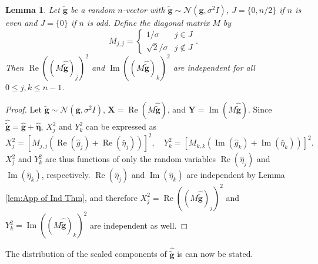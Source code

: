 \documentclass[12pt]{article}
\newcommand{\gVec}{\mathbf{g}}	%
\newcommand{\gnoiseVec}{\widetilde{\mathbf{g}}}	%
\newcommand{\noise}{\eta}	%
\newcommand{\noiseSD}{\sigma}	%
\newcommand{\noiseVec}{\bm{\noise}}	%
\renewcommand{\Re}{\operatorname{Re}}	%
\renewcommand{\Im}{\operatorname{Im}}	%
\newtheorem{lemma}{Lemma}[section]
\begin{document}
\begin{lemma}
\label{lem:App of Ind Thm 2}
Let $\gnoiseVec$ be a random $n$-vector with $\gnoiseVec \sim \mathcal{N}(\gVec,\noiseSD^2 I)$, $J = \{0,n/2\}$ if $n$ is even and $J = \{0\}$ if $n$ is odd. Define the diagonal matrix $M$ by
\[M_{j,j} = \begin{cases}
1/\noiseSD & j \in J \\
\sqrt{2}/\noiseSD & j \not\in J
\end{cases}.\]
Then $\Re((M\widehat{\gnoiseVec})_j)^2$ and $\Im((M\widehat{\gnoiseVec})_k)^2$ are independent for all $0 \leq j,k \leq n-1$.
\end{lemma}
\begin{proof}
Let $\gnoiseVec \sim \mathcal{N}(\gVec,\noiseSD^2 I)$, $\mathbf{X} = \Re(M\widehat{\gnoiseVec})$, and $\mathbf{Y} = \Im(M\widehat{\gnoiseVec})$. Since $\widehat{\gnoiseVec} = \widehat{\gVec} + \widehat{\noiseVec}$, $X_j^2$ and $Y_k^2$ can be expressed as 
\[X_j^2 = [M_{j,j}(\Re(\widehat{g}_j) + \Re(\widehat{\noise}_j))]^2, \quad Y_k^2 = [M_{k,k}(\Im(\widehat{g}_k) + \Im(\widehat{\noise}_k))]^2.\]
$X_j^2$ and $Y_k^2$ are thus functions of only the random variables $\Re(\widehat{\noise}_j)$ and $\Im(\widehat{\noise}_k)$, respectively. $\Re(\widehat{\noise}_j)$ and $\Im(\widehat{\noise}_k)$ are independent by Lemma \ref{lem:App of Ind Thm}, and therefore $X_j^2 = \Re((M\widehat{\gnoiseVec})_j)^2$ and $Y_k^2 = \Im((M\widehat{\gnoiseVec})_k)^2$ are independent as well.
\end{proof}

The distribution of the scaled components of $\widehat{\gnoiseVec}$ is can now be stated. 
\end{document}
